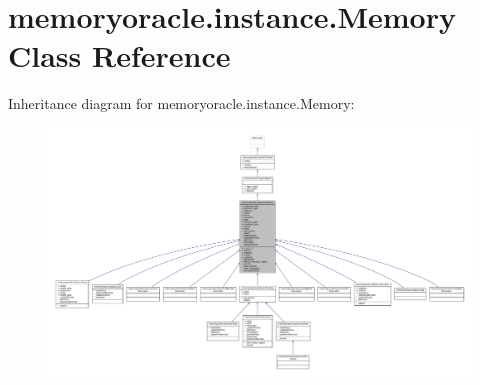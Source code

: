 \hypertarget{classmemoryoracle_1_1instance_1_1Memory}{}\section{memoryoracle.\+instance.\+Memory Class Reference}
\label{classmemoryoracle_1_1instance_1_1Memory}


Inheritance diagram for memoryoracle.\+instance.\+Memory\+:
\nopagebreak
\begin{figure}[H]
\begin{center}
\leavevmode
\includegraphics[width=350pt]{classmemoryoracle_1_1instance_1_1Memory__inherit__graph}
\end{center}
\end{figure}


